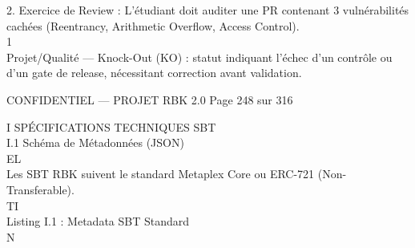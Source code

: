 \vspace{0.5em}
2. Exercice de Review : L’étudiant doit auditer une PR contenant 3 vulnérabilités cachées (Reentrancy, Arithmetic Overflow, Access Control).\\
\vspace{0.5em}
\vspace{0.5em}
\vspace{0.5em}
\vspace{0.5em}
1\\
Projet/Qualité — Knock-Out (KO) : statut indiquant l’échec d’un contrôle ou d’un gate de release, nécessitant correction avant validation.\\
\vspace{0.5em}
\vspace{0.5em}
\begin{confidential}CONFIDENTIEL — PROJET RBK 2.0                                              Page 248 sur 316\end{confidential}
I \textbar{} SPÉCIFICATIONS TECHNIQUES SBT\\
\vspace{0.5em}
\vspace{0.5em}
I.1 Schéma de Métadonnées (JSON)\\
\vspace{0.5em}
\vspace{0.5em}
\vspace{0.5em}
\vspace{0.5em}
EL\\
Les SBT RBK suivent le standard Metaplex Core ou ERC-721 (Non-Transferable).\\
\vspace{0.5em}
\vspace{0.5em}
\vspace{0.5em}
\vspace{0.5em}
TI\\
Listing I.1 : Metadata SBT Standard\\
\vspace{0.5em}
\vspace{0.5em}
\vspace{0.5em}
\vspace{0.5em}
N\\
